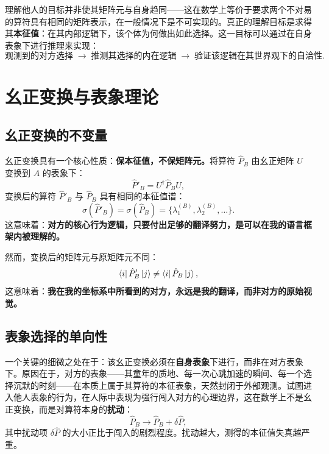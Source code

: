 ﻿\documentclass[12pt,a4paper]{ctexart}
\begin{document}
理解他人的目标并非使其矩阵元与自身趋同——这在数学上等价于要求两个不对易的算符具有相同的矩阵表示，在一般情况下是不可实现的。真正的理解目标是求得其\textbf{本征值}：在其内部逻辑下，该个体为何做出如此选择。这一目标可以通过在自身表象下进行推理来实现：
\begin{equation}
\text{观测到的对方选择}\; \longrightarrow \; \text{推测其选择的内在逻辑}\; \longrightarrow \; \text{验证该逻辑在其世界观下的自洽性}.
\label{eq:inference}
\end{equation}

\section{幺正变换与表象理论}

\subsection{幺正变换的不变量}

幺正变换具有一个核心性质：\textbf{保本征值，不保矩阵元。}将算符 $\hat{P}_B$ 由幺正矩阵 $U$ 变换到 $A$ 的表象下：
\begin{equation}
\hat{P}'_B = U^\dagger \hat{P}_B U,
\end{equation}
变换后的算符 $\hat{P}'_B$ 与 $\hat{P}_B$ 具有相同的本征值谱：
\begin{equation}
\sigma(\hat{P}'_B) = \sigma(\hat{P}_B) = \{\lambda^{(B)}_1, \lambda^{(B)}_2, \dots\}.
\end{equation}
这意味着：\textbf{对方的核心行为逻辑，只要付出足够的翻译努力，是可以在我的语言框架内被理解的。}

然而，变换后的矩阵元与原矩阵元不同：
\begin{equation}
\bra{i}\hat{P}'_B\ket{j} \neq \bra{i}\hat{P}_B\ket{j},
\end{equation}
这意味着：\textbf{我在我的坐标系中所看到的对方，永远是我的翻译，而非对方的原始视觉。}

\subsection{表象选择的单向性}

一个关键的细微之处在于：该幺正变换必须在\textbf{自身表象}下进行，而非在对方表象下。原因在于，对方的表象——其童年的质地、每一次心跳加速的瞬间、每一个选择沉默的时刻——在本质上属于其算符的本征表象，天然封闭于外部观测。试图进入他人表象的行为，在人际中表现为强行闯入对方的心理边界，这在数学上不是幺正变换，而是对算符本身的\textbf{扰动}：
\begin{equation}
\hat{P}_B \to \hat{P}_B + \delta\hat{P},
\end{equation}
其中扰动项 $\delta\hat{P}$ 的大小正比于闯入的剧烈程度。扰动越大，测得的本征值失真越严重。
\end{document}
